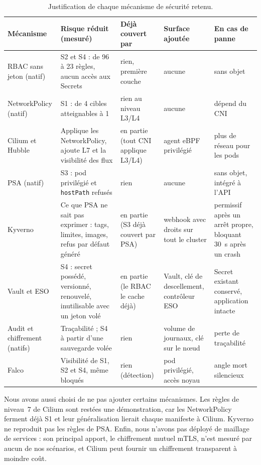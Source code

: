 \documentclass[11pt,a4paper]{article}
\newcommand{\code}[1]{\texttt{#1}}
\begin{document}
\begin{table}[H]
\centering
\caption{Justification de chaque mécanisme de sécurité retenu.}
\label{tab:outils}
\footnotesize
\begin{tabularx}{\textwidth}{@{}>{\raggedright\arraybackslash}p{2.3cm} L L L L@{}}
\toprule
\textbf{Mécanisme} & \textbf{Risque réduit (mesuré)} & \textbf{Déjà couvert par} & \textbf{Surface ajoutée} & \textbf{En cas de panne} \\
\midrule
RBAC sans jeton (natif) & S2 et S4 : de 96 à 23 règles, aucun accès aux Secrets & rien, première couche & aucune & sans objet \\
NetworkPolicy (natif) & S1 : de 4 cibles atteignables à 1 & rien au niveau L3/L4 & aucune & dépend du CNI \\
Cilium et Hubble & Applique les NetworkPolicy, ajoute L7 et la visibilité des flux & en partie (tout CNI applique L3/L4) & agent eBPF privilégié & plus de réseau pour les pods \\
PSA (natif) & S3 : pod privilégié et \code{hostPath} refusés & rien & aucune & sans objet, intégré à l'API \\
Kyverno & Ce que PSA ne sait pas exprimer : tags, limites, images, refus par défaut généré & en partie (S3 déjà couvert par PSA) & webhook avec droits sur tout le cluster & permissif après un arrêt propre, bloquant 30~s après un crash \\
Vault et ESO & S4 : secret possédé, versionné, renouvelé, inutilisable avec un jeton volé & en partie (le RBAC le cache déjà) & Vault, clé de descellement, contrôleur ESO & Secret existant conservé, application intacte \\
Audit et chiffrement (natifs) & Traçabilité ; S4 à partir d'une sauvegarde volée & rien & volume de journaux, clé sur le nœud & perte de traçabilité \\
Falco & Visibilité de S1, S2 et S4, même bloqués & rien (détection) & pod privilégié, accès noyau & angle mort silencieux \\
\bottomrule
\end{tabularx}
\end{table}

Nous avons aussi choisi de ne pas ajouter certains mécanismes. Les règles de niveau~7 de Cilium sont restées une démonstration, car les NetworkPolicy ferment déjà S1 et leur généralisation lierait chaque manifeste à Cilium. Kyverno ne reproduit pas les règles de PSA. Enfin, nous n'avons pas déployé de maillage de services : son principal apport, le chiffrement mutuel mTLS, n'est mesuré par aucun de nos scénarios, et Cilium peut fournir un chiffrement transparent à moindre coût.
\end{document}
